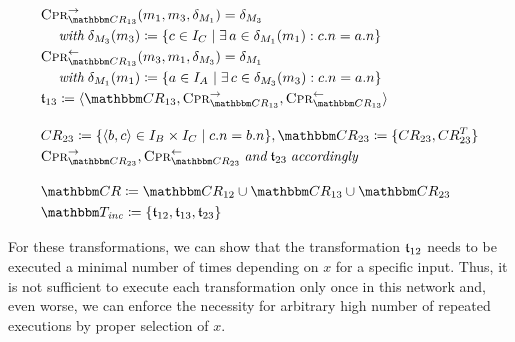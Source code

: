 \begin{align*}
    & 
    \consistencypreservationrule{\consistencyrelationset{CR}_{13}}^{\rightarrow}(\model{m}{1}, \model{m}{3}, \change{\metamodel{M}{1}}) = \change{\metamodel{M}{3}} \\
    & \formulaskip
    \withmath \change{\metamodel{M}{3}}(\model{m}{3}) \equalsperdefinition \setted{c \in \instances{\class{C}{}} \mid \exists a \in \change{\metamodel{M}{1}}(\model{m}{1}) : c.n = a.n} \\
    & 
    \consistencypreservationrule{\consistencyrelationset{CR}_{13}}^{\leftarrow}(\model{m}{3}, \model{m}{1}, \change{\metamodel{M}{3}}) = \change{\metamodel{M}{1}} \\
    & \formulaskip
    \withmath \change{\metamodel{M}{1}}(\model{m}{1}) \equalsperdefinition \setted{a \in \instances{\class{A}{}} \mid \exists c \in \change{\metamodel{M}{3}}(\model{m}{3}) : c.n = a.n} \\
    & 
    \transformation{t}_{13} \equalsperdefinition \tupled{\consistencyrelationset{CR}_{13}, \consistencypreservationrule{\consistencyrelationset{CR}_{13}}^{\rightarrow}, \consistencypreservationrule{\consistencyrelationset{CR}_{13}}^{\leftarrow}} \\[1em]
    &
    \consistencyrelation{CR}{23} \equalsperdefinition \setted{\tupled{b,c} \in \instances{\class{B}{}} \times \instances{\class{C}{}} \mid c.n = b.n}, \consistencyrelationset{CR}_{23} \equalsperdefinition \setted{\consistencyrelation{CR}{23}, \consistencyrelation{CR}{23}^T} \\
    & 
    \consistencypreservationrule{\consistencyrelationset{CR}_{23}}^{\rightarrow}, \consistencypreservationrule{\consistencyrelationset{CR}_{23}}^{\leftarrow} \andmath \transformation{t}_{23} \mathtextspacearound{accordingly} \\[1em]
    &
    \consistencyrelationset{CR} \equalsperdefinition \consistencyrelationset{CR}_{12} \cup \consistencyrelationset{CR}_{13} \cup \consistencyrelationset{CR}_{23} \\
    &
    \transformationset{T}_\mathvariable{inc} \equalsperdefinition \setted{\transformation{t}_{12}, \transformation{t}_{13}, \transformation{t}_{23}}
\end{align*}

For these transformations, we can show that the transformation $\mathfrak{t}_{12}$ needs to be executed a minimal number of times depending on $x$ for a specific input.
Thus, it is not sufficient to execute each transformation only once in this network and, even worse, we can enforce the necessity for arbitrary high number of repeated executions by proper selection of $x$.

